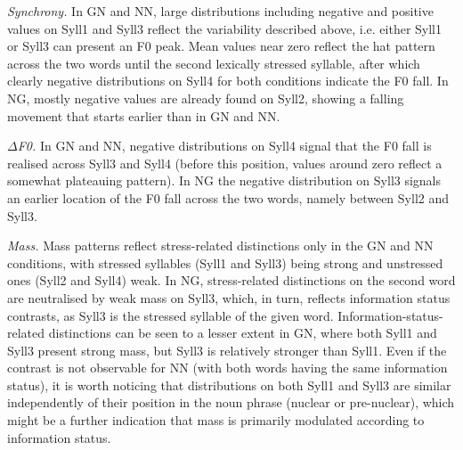 \begin{listWWNumiiileveli}
\item 
\begin{stylelsBulletList}
\textit{Synchrony.} In GN and NN, large distributions including negative and positive values on Syll1 and Syll3 reflect the variability described above, i.e. either Syll1 or Syll3 can present an F0 peak. Mean values near zero reflect the hat pattern across the two words until the second lexically stressed syllable, after which clearly negative distributions on Syll4 for both conditions indicate the F0 fall. In NG, mostly negative values are already found on Syll2, showing a falling movement that starts earlier than in GN and NN.
\end{stylelsBulletList}
\item 
\begin{stylelsBulletList}
\textit{${\Delta}$F0.} In GN and NN, negative distributions on Syll4 signal that the F0 fall is realised across Syll3 and Syll4 (before this position, values around zero reflect a somewhat plateauing pattern). In NG the negative distribution on Syll3 signals an earlier location of the F0 fall across the two words, namely between Syll2 and Syll3.
\end{stylelsBulletList}
\item 
\begin{stylelsBulletList}
\textit{Mass.} Mass patterns reflect stress-related distinctions only in the GN and NN conditions, with stressed syllables (Syll1 and Syll3) being strong and unstressed ones (Syll2 and Syll4) weak. In NG, stress-related distinctions on the second word are neutralised by weak mass on Syll3, which, in turn, reflects information status contrasts, as Syll3 is the stressed syllable of the given word. Information-status-related distinctions can be seen to a lesser extent in GN, where both Syll1 and Syll3 present strong mass, but Syll3 is relatively stronger than Syll1. Even if the contrast is not observable for NN (with both words having the same information status), it is worth noticing that distributions on both Syll1 and Syll3 are similar independently of their position in the noun phrase (nuclear or pre-nuclear), which might be a further indication that mass is primarily modulated according to information status.
\end{stylelsBulletList}
\end{listWWNumiiileveli}
\begin{stylecaption}
  [Warning: Image ignored] %
 
\end{stylecaption}

